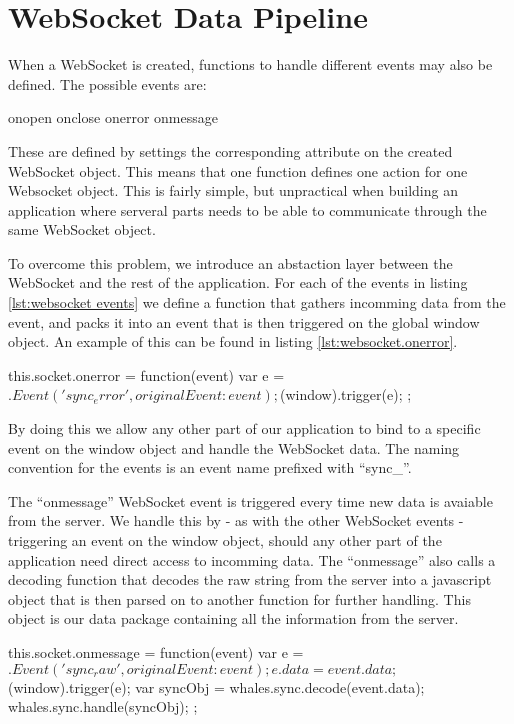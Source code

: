\section{WebSocket Data Pipeline}

When a WebSocket is created, functions to handle different events may also be
defined. The possible events are:

\begin{snippet}[label=lst:websocket events]
onopen
onclose
onerror
onmessage
\end{snippet}

These are defined by settings the corresponding attribute on the created 
WebSocket object. This means that one function defines one action for one
Websocket object. This is fairly simple, but unpractical when building an
application where serveral parts needs to be able to communicate through the 
same WebSocket object.


To overcome this problem, we introduce an abstaction layer between the 
WebSocket and the rest of the application. For each of the events in listing
\ref{lst:websocket events} we define a function that gathers incomming data from
the event, and packs it into an event that is then triggered on the global
window object. An example of this can be found in listing
\ref{lst:websocket.onerror}.

\begin{snippet}[caption=The onerror websocket event,label=lst:websocket.onerror] 
this.socket.onerror = function(event){
    var e = $.Event('sync_error',{
        originalEvent:event
    });
    $(window).trigger(e);
};
\end{snippet}

By doing this we allow any other part of our application to bind to a specific
event on the window object and handle the WebSocket data. The naming convention
for the events is an event name prefixed with ``sync\_''.


The ``onmessage'' WebSocket event is triggered every time new data is avaiable
from the server. We handle this by - as with the other WebSocket events -
triggering an event on the window object, should any other part of the
application need direct access to incomming data. The ``onmessage'' also calls a
decoding function that decodes the raw string from the server into a javascript
object that is then parsed on to another function for further handling.
This object is our data package containing all the information from the server.

\begin{snippet}[caption=The onmessage WebSocket event,label=lst:websocket.onmessage]
this.socket.onmessage = function(event){
    var e = $.Event('sync_raw',{
        originalEvent:event
    });
    e.data = event.data;
    $(window).trigger(e);
    var syncObj = whales.sync.decode(event.data);
    whales.sync.handle(syncObj);
};
\end{snippet}

